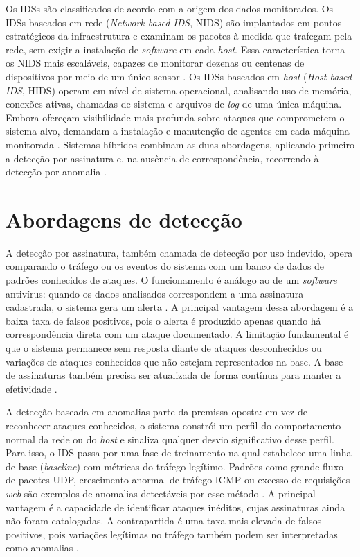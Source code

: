 Os IDSs são classificados de acordo com a origem dos dados monitorados. Os IDSs baseados em rede (\textit{Network-based IDS}, NIDS) são implantados em pontos estratégicos da infraestrutura e examinam os pacotes à medida que trafegam pela rede, sem exigir a instalação de \textit{software} em cada \textit{host}. Essa característica torna os NIDS mais escaláveis, capazes de monitorar dezenas ou centenas de dispositivos por meio de um único sensor \cite{santos2023ercemapi}. Os IDSs baseados em \textit{host} (\textit{Host-based IDS}, HIDS) operam em nível de sistema operacional, analisando uso de memória, conexões ativas, chamadas de sistema e arquivos de \textit{log} de uma única máquina. Embora ofereçam visibilidade mais profunda sobre ataques que comprometem o sistema alvo, demandam a instalação e manutenção de agentes em cada máquina monitorada \cite{liborio2015}. Sistemas híbridos combinam as duas abordagens, aplicando primeiro a detecção por assinatura e, na ausência de correspondência, recorrendo à detecção por anomalia \cite{liborio2015}.

\section{Abordagens de detecção}

A detecção por assinatura, também chamada de detecção por uso indevido, opera comparando o tráfego ou os eventos do sistema com um banco de dados de padrões conhecidos de ataques. O funcionamento é análogo ao de um \textit{software} antivírus: quando os dados analisados correspondem a uma assinatura cadastrada, o sistema gera um alerta \cite{liborio2015}. A principal vantagem dessa abordagem é a baixa taxa de falsos positivos, pois o alerta é produzido apenas quando há correspondência direta com um ataque documentado. A limitação fundamental é que o sistema permanece sem resposta diante de ataques desconhecidos ou variações de ataques conhecidos que não estejam representados na base. A base de assinaturas também precisa ser atualizada de forma contínua para manter a efetividade \cite{ravindran2025}.

A detecção baseada em anomalias parte da premissa oposta: em vez de reconhecer ataques conhecidos, o sistema constrói um perfil do comportamento normal da rede ou do \textit{host} e sinaliza qualquer desvio significativo desse perfil. Para isso, o IDS passa por uma fase de treinamento na qual estabelece uma linha de base (\textit{baseline}) com métricas do tráfego legítimo. Padrões como grande fluxo de pacotes UDP, crescimento anormal de tráfego ICMP ou excesso de requisições \textit{web} são exemplos de anomalias detectáveis por esse método \cite{liborio2015}. A principal vantagem é a capacidade de identificar ataques inéditos, cujas assinaturas ainda não foram catalogadas. A contrapartida é uma taxa mais elevada de falsos positivos, pois variações legítimas no tráfego também podem ser interpretadas como anomalias \cite{santos2023ercemapi}.

